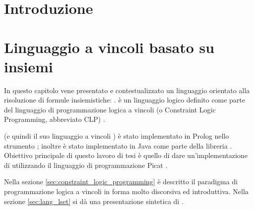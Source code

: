 \documentclass[12pt,a4paper,openright]{book} %
\newenvironment{dedication}                   %
  {%
   \thispagestyle{empty}%
   \vspace*{\stretch{1}}%
   \itshape             %
   \raggedleft          %
  }
  {\par %
   \vspace{\stretch{3}} %
   \clearpage           %
  }
\begin{document}

\tableofcontents
\listoffigures



\chapter*{Introduzione}

\lipsum[1-4]


%
%


\chapter{Linguaggio a vincoli basato su insiemi}
\label{ch:sets_based_constraint_language}

\minitoc

In questo capitolo vene presentato e contestualizzato un linguaggio orientato alla risoluzione di formule insiemistiche: \lset{}. \lset{} è un linguaggio logico definito come parte del linguaggio di programmazione logica a vincoli (o Constraint Logic Programming, abbreviato CLP) \clpset{}.

\clpset{} (e quindi il suo linguaggio a vincoli \lset{}) è stato implementato in Prolog nello strumento \setlog{} \cite{SetLog}; inoltre \lset{} è stato implementato in Java come parte della libreria \jsetl{} \cite{JSetL}. Obiettivo principale di questo lavoro di tesi è quello di dare un’implementazione di \lset{} utilizzando il linguaggio di programmazione Picat \cite{PicatLang}.

Nella sezione \ref{sec:constraint_logic_programming} è descritto il paradigma di programmazione logica a vincoli in forma molto discorsiva ed introduttiva. Nella sezione \ref{sec:lang_lset} si dà una presentazione sintetica di \lset{}.
\end{document}
